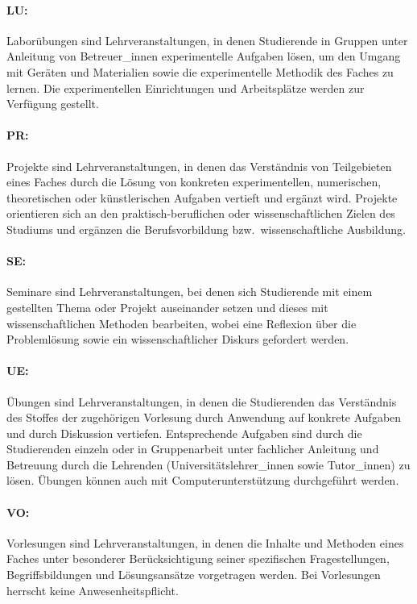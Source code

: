 \paragraph{LU:} Laborübungen sind Lehrveranstaltungen, in denen
Studierende in Gruppen unter Anleitung von Betreuer\_innen 
experimentelle Aufgaben lösen, um den Umgang mit Geräten und
Materialien sowie die experimentelle Methodik des Faches zu
lernen. Die experimentellen Einrichtungen und Arbeitsplätze werden zur
Verfügung gestellt.

\paragraph{PR:} Projekte sind Lehrveranstaltungen, in denen das
Verständnis von Teilgebieten eines Faches durch die Lösung von
konkreten experimentellen, numerischen, theoretischen oder
künstlerischen Aufgaben vertieft und ergänzt wird. Projekte
orientieren sich an den praktisch-beruflichen oder wissenschaftlichen
Zielen des Studiums und ergänzen die Berufsvorbildung
bzw.\ wissenschaftliche Ausbildung.

\paragraph{SE:} Seminare sind Lehrveranstaltungen, bei denen sich
Studierende mit einem gestellten Thema oder Projekt auseinander setzen
und dieses mit wissenschaftlichen Methoden bearbeiten, wobei eine
Reflexion über die Problemlösung sowie ein wissenschaftlicher Diskurs
gefordert werden.

\paragraph{UE:} Übungen sind Lehrveranstaltungen, in denen die
Studierenden das Verständnis des Stoffes der zugehörigen Vorlesung
durch Anwendung auf konkrete Aufgaben und durch Diskussion
vertiefen. Entsprechende Aufgaben sind durch die Studierenden einzeln
oder in Gruppenarbeit unter fachlicher Anleitung und Betreuung durch
die Lehrenden (Universitätslehrer\_innen sowie Tutor\_innen) zu lösen.
Übungen können auch mit Computerunterstützung durchgeführt werden.

\paragraph{VO:} Vorlesungen sind Lehrveranstaltungen, in denen die
Inhalte und Methoden eines Faches unter besonderer Berücksichtigung
seiner spezifischen Fragestellungen, Begriffsbildungen und
Lösungsansätze vorgetragen werden. Bei Vorlesungen herrscht keine
Anwesenheitspflicht.

